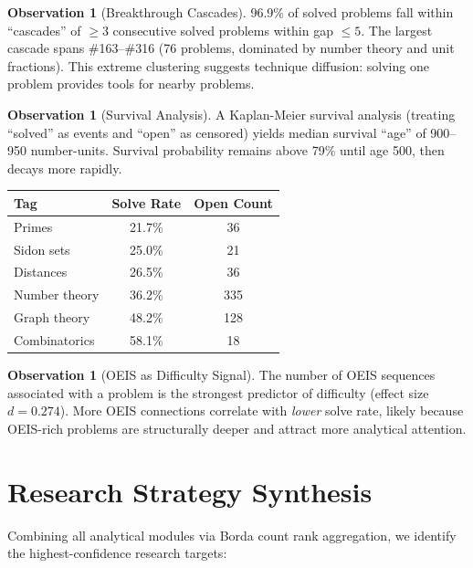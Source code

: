 \documentclass[11pt,a4paper]{article}
\theoremstyle{definition}
\newtheorem{observation}[theorem]{Observation}
\theoremstyle{remark}
\begin{document}
\begin{observation}[Breakthrough Cascades]
96.9\% of solved problems fall within ``cascades'' of $\geq 3$ consecutive
solved problems within gap $\leq 5$. The largest cascade spans \#163--\#316
(76 problems, dominated by number theory and unit fractions). This extreme
clustering suggests technique diffusion: solving one problem provides tools
for nearby problems.
\end{observation}

\begin{observation}[Survival Analysis]
A Kaplan-Meier survival analysis (treating ``solved'' as events and ``open''
as censored) yields median survival ``age'' of 900--950 number-units.
Survival probability remains above 79\% until age 500, then decays more
rapidly.
\end{observation}

\begin{center}
\begin{tabular}{lcc}
\toprule
Tag & Solve Rate & Open Count \\
\midrule
Primes & 21.7\% & 36 \\
Sidon sets & 25.0\% & 21 \\
Distances & 26.5\% & 36 \\
Number theory & 36.2\% & 335 \\
Graph theory & 48.2\% & 128 \\
Combinatorics & 58.1\% & 18 \\
\bottomrule
\end{tabular}
\end{center}

\begin{observation}[OEIS as Difficulty Signal]
The number of OEIS sequences associated with a problem is the strongest
predictor of difficulty (effect size $d = 0.274$). More OEIS connections
correlate with \emph{lower} solve rate, likely because OEIS-rich problems
are structurally deeper and attract more analytical attention.
\end{observation}

\section{Research Strategy Synthesis}

Combining all analytical modules via Borda count rank aggregation, we
identify the highest-confidence research targets:
\end{document}
